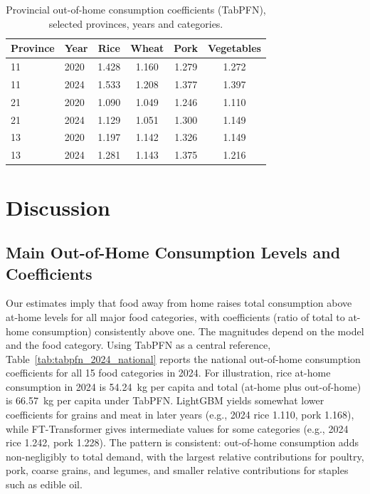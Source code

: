 \documentclass[12pt,a4paper]{article}
\begin{document}
\begin{table}[htbp]
\centering
\caption{Provincial out-of-home consumption coefficients (TabPFN), selected provinces, years and categories.}
\label{tab:provincial_heterogeneity}
\begin{tabular}{llcccc}
\toprule
Province & Year & Rice & Wheat & Pork & Vegetables \\
\midrule
11 & 2020 & 1.428 & 1.160 & 1.279 & 1.272 \\
11 & 2024 & 1.533 & 1.208 & 1.377 & 1.397 \\
21 & 2020 & 1.090 & 1.049 & 1.246 & 1.110 \\
21 & 2024 & 1.129 & 1.051 & 1.300 & 1.149 \\
13 & 2020 & 1.197 & 1.142 & 1.326 & 1.149 \\
13 & 2024 & 1.281 & 1.143 & 1.375 & 1.216 \\
\bottomrule
\end{tabular}
\end{table}

\section{Discussion}
\label{sec:discussion}

\subsection{Main Out-of-Home Consumption Levels and Coefficients}

Our estimates imply that food away from home raises total consumption above at-home levels for all major food categories, with coefficients (ratio of total to at-home consumption) consistently above one. The magnitudes depend on the model and the food category. Using TabPFN as a central reference, Table~\ref{tab:tabpfn_2024_national} reports the national out-of-home consumption coefficients for all 15 food categories in 2024. For illustration, rice at-home consumption in 2024 is 54.24~kg per capita and total (at-home plus out-of-home) is 66.57~kg per capita under TabPFN. LightGBM yields somewhat lower coefficients for grains and meat in later years (e.g., 2024 rice 1.110, pork 1.168), while FT-Transformer gives intermediate values for some categories (e.g., 2024 rice 1.242, pork 1.228). The pattern is consistent: out-of-home consumption adds non-negligibly to total demand, with the largest relative contributions for poultry, pork, coarse grains, and legumes, and smaller relative contributions for staples such as edible oil.
\end{document}
